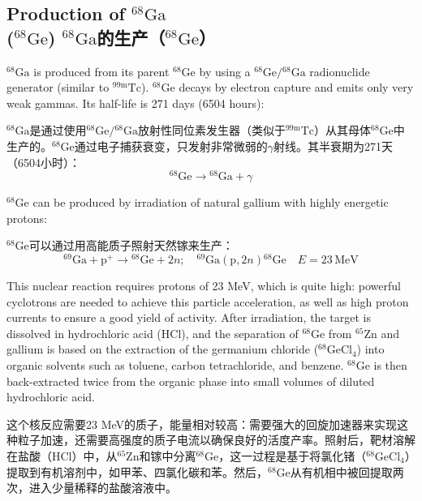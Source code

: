 \documentclass[dvipsnames, svgnames,a4paper,11pt]{article}
\begin{document}
\subsection{Production of \(\mathrm{^{68}Ga}\)\\ (\(\mathrm{^{68}Ge}\)) \(\mathrm{^{68}Ga}\)的生产（\(\mathrm{^{68}Ge}\)）}  
\(\mathrm{^{68}Ga}\) is produced from its parent \(\mathrm{^{68}Ge}\) by using a \(\mathrm{^{68}Ge}/\mathrm{^{68}Ga}\) radionuclide generator (similar to \(\mathrm{^{99m}Tc}\)). \(\mathrm{^{68}Ge}\) decays by electron capture and emits only very weak gammas. Its half-life is 271 days (6504 hours):  

\(\mathrm{^{68}Ga}\)是通过使用\(\mathrm{^{68}Ge}/\mathrm{^{68}Ga}\)放射性同位素发生器（类似于\(\mathrm{^{99m}Tc}\)）从其母体\(\mathrm{^{68}Ge}\)中生产的。\(\mathrm{^{68}Ge}\)通过电子捕获衰变，只发射非常微弱的$\gamma$射线。其半衰期为271天（6504小时）：  
\[
\mathrm{^{68}Ge} \rightarrow \mathrm{^{68}Ga} + \gamma
\]

\(\mathrm{^{68}Ge}\) can be produced by irradiation of natural gallium with highly energetic protons:  

\(\mathrm{^{68}Ge}\)可以通过用高能质子照射天然镓来生产：  
\[
\mathrm{^{69}Ga} + \mathrm{p}^{+} \rightarrow \mathrm{^{68}Ge} + 2n; \quad \mathrm{^{69}Ga}(\mathrm{p}, 2n)\mathrm{^{68}Ge} \quad E = 23 \, \mathrm{MeV}
\]

This nuclear reaction requires protons of 23 MeV, which is quite high: powerful cyclotrons are needed to achieve this particle acceleration, as well as high proton currents to ensure a good yield of activity. After irradiation, the target is dissolved in hydrochloric acid (HCl), and the separation of \(\mathrm{^{68}Ge}\) from \(\mathrm{^{65}Zn}\) and gallium is based on the extraction of the germanium chloride (\(\mathrm{^{68}GeCl_4}\)) into organic solvents such as toluene, carbon tetrachloride, and benzene. \(\mathrm{^{68}Ge}\) is then back-extracted twice from the organic phase into small volumes of diluted hydrochloric acid.

这个核反应需要23 MeV的质子，能量相对较高：需要强大的回旋加速器来实现这种粒子加速，还需要高强度的质子电流以确保良好的活度产率。照射后，靶材溶解在盐酸（HCl）中，从\(\mathrm{^{65}Zn}\)和镓中分离\(\mathrm{^{68}Ge}\)，这一过程是基于将氯化锗（\(\mathrm{^{68}GeCl_4}\)）提取到有机溶剂中，如甲苯、四氯化碳和苯。然后，\(\mathrm{^{68}Ge}\)从有机相中被回提取两次，进入少量稀释的盐酸溶液中。
\end{document}
